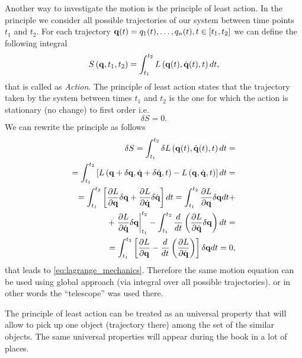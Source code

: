 Another way to investigate the motion is the principle of least
action.  In the principle we consider
all possible trajectories of our system between time points $t_1$ and
$t_2$. For each trajectory ${\bf q}(t) = {q_1(t), \dots, q_n(t)}, t
\in [t_1, t_2]$ we can define the following integral
\begin{equation}
S\left({\bf q}, t_1, t_2\right) = \int_{t_1}^{t_2}L\left({\bf q}(t), 
\dot{\bf q}(t), t\right) dt,
\label{eq:action}
\end{equation}
that is called as \textit{Action}. The principle of least action
states that the trajectory taken by the system between times $t_1$ and
$t_2$ is the one for which the action is stationary (no change) to
first order \cite{wiki:least_action_principle} i.e.
\[
\delta S = 0.
\]
We can rewrite the principle as follows
\begin{eqnarray}
\delta S = 
\int_{t_1}^{t_2} \delta L\left({\bf q}(t), 
\dot{\bf q}(t), t\right) dt = 
\nonumber \\
=
\int_{t_1}^{t_2} \left[L\left({\bf q} + \delta {\bf q} , 
\dot{\bf q} + \delta \dot{\bf q}, t\right) - L\left({\bf q}, 
\dot{\bf q}, t\right)\right] dt = 
\nonumber \\
= 
\int_{t_1}^{t_2} \left[\frac{\partial L}{\partial {\bf q}} \delta {\bf
    q} + \frac{\partial L}{\partial \dot{\bf q}} \delta \dot{\bf
    q}\right] dt =  
\int_{t_1}^{t_2} \frac{\partial L}{\partial {\bf q}} \delta {\bf
    q} dt 
+
\nonumber \\
+
\left. \frac{\partial L}{\partial \dot{\bf q}} \delta {\bf q} \right|_{t_1}^{t_2} - 
\int_{t_1}^{t_2} \frac{d}{d t} \left( \frac{\partial L}{\partial
  \dot{\bf q}} \delta {\bf q}\right) dt = 
\nonumber \\
= \int_{t_1}^{t_2} \left[
\frac{\partial L}{\partial {\bf q}} -
\frac{d}{d t} \left( \frac{\partial L}{\partial
  \dot{\bf q}} \right)
\right] \delta {\bf q} dt = 0,
\nonumber
\end{eqnarray}
that leads to \eqref{eq:lagrange_mechanics}. Therefore the same motion
equation can be used using global approach (via integral over all
possible trajectories). or in other words the ``telescope'' was used
there. 

\begin{remark}
\label{rem:universalpropertymechanics}
The principle of least action can be treated as an universal property
that will allow to pick up one object (trajectory there) among the set
of the similar objects. The same universal properties will appear
during the book in a lot of places.
\end{remark}

